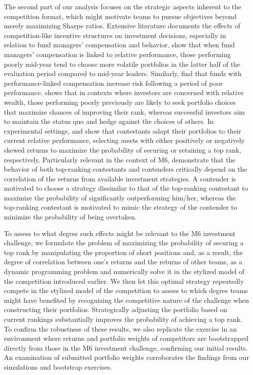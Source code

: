 \documentclass[3p,times,twocolumn]{elsarticle}
\begin{document}
The second part of our analysis focuses on the strategic aspects inherent to the competition format, which might motivate teams to pursue objectives beyond merely maximizing Sharpe ratios. 
Extensive literature documents the effects of competition-like incentive structures on investment decisions, especially in relation to fund managers' compensation and behavior. 
\citet{brownTournamentsTemptationsAnalysis1996} show that when fund managers' compensation is linked to relative performance, those performing poorly mid-year tend to choose more volatile portfolios in the latter half of the evaluation period compared to mid-year leaders.
Similarly, \citet{eltonIncentiveFeesMutual2003} find that funds with performance-linked compensation increase risk following a period of poor performance.
\citet{krasnyAssetPricingStatus2011} shows that in contexts where investors are concerned with relative wealth, those performing poorly previously are likely to seek portfolio choices that maximize chances of improving their rank, whereas successful investors aim to maintain the status quo and hedge against the choices of others.
In experimental settings, \citet{linFundConvexityTail2011} and \citet{dijkRankMattersImpact2014} show that contestants adapt their portfolios to their current relative performance, selecting assets with either positively or negatively skewed returns to maximize the probability of securing or retaining a top rank, respectively.
Particularly relevant in the context of M6, \citet{niekenRisktakingTournamentsTheory2010} demonstrate that the behavior of both top-ranking contestants and contenders critically depend on the correlation of the returns from available investment strategies.
A contender is motivated to choose a strategy dissimilar to that of the top-ranking contestant to maximize the probability of significantly outperforming him/her, whereas the top-ranking contestant is motivated to mimic the strategy of the contender to minimize the probability of being overtaken.

To assess to what degree such effects might be relevant to the M6 investment challenge, we formulate the problem of maximizing the probability of securing a top rank by manipulating the proportion of short positions and, as a result, the degree of correlation between one's returns and the returns of other teams, as a dynamic programming problem and numerically solve it in the stylized model of the competition introduced earlier.
We then let this optimal strategy repeatedly compete in the stylized model of the competition to assess to which degree teams might have benefited by recognizing the competitive nature of the challenge when constructing their portfolios.
Strategically adjusting the portfolio based on current rankings substantially improves the probability of achieving a top rank.
To confirm the robustness of these results, we also replicate the exercise in an environment where returns and portfolio weights of competitors are bootstrapped directly from those in the M6 investment challenge, confirming our initial results.
An examination of submitted portfolio weights corroborates the findings from our simulations and bootstrap exercises.
\end{document}
